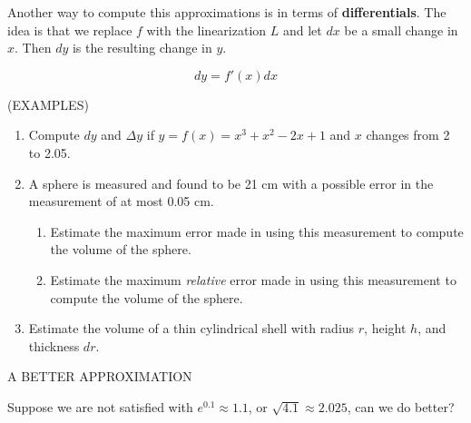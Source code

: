 \documentclass[11pt]{article}
\begin{document}
Another way to compute this approximations is in terms of {\bf differentials}.  The idea is that we replace $f$ with the linearization $L$
and let $dx$ be a small change in $x$.  Then $dy$ is the resulting change in $y$.

\begin{displaymath}
dy = f'(x)dx
  \end{displaymath}

\vspace{1.25in}

(EXAMPLES)

\begin{enumerate}
\item{Compute $dy$ and $\Delta y$ if $y=f(x)=x^3+x^2-2x+1$ and $x$ changes from 2 to 2.05.}


\vspace{1.75in}
\item{A sphere is measured and found to be 21 cm with a possible error in the measurement of at most 0.05 cm.  
\begin{enumerate}
\item{Estimate the maximum error made in using this measurement to compute the volume of the sphere.}
\item{Estimate the maximum \emph{relative} error made in using this measurement to compute the volume of the sphere.}
\end{enumerate}
  }
  \pagebreak
  \item{Estimate the volume of a thin cylindrical shell with radius $r$, height $h$, and thickness $dr$.}

\end{enumerate}

\vspace{3in}

A BETTER APPROXIMATION

\vspace{0.1in}

Suppose we are not satisfied with $e^{0.1}\approx 1.1$, or $\sqrt{4.1}\approx 2.025$, can we do better?
\end{document}
